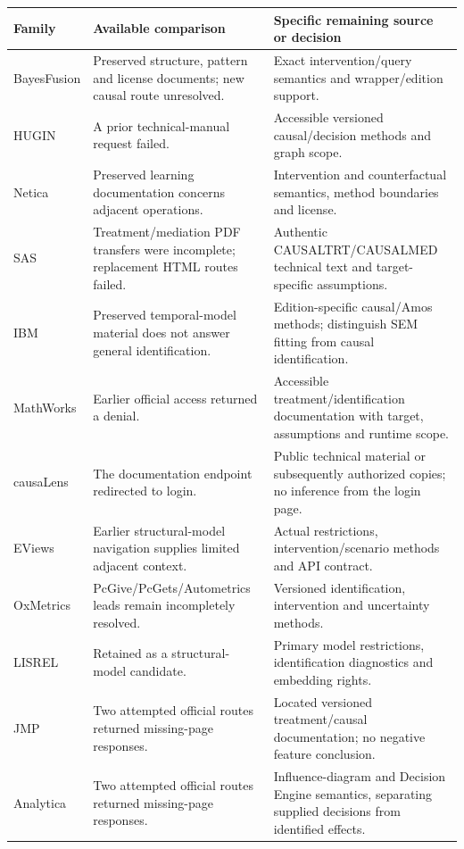 \begin{longtable}{p{}p{}p{}}
\toprule
Family & Available comparison & Specific remaining source or decision \\
\midrule
\endhead
BayesFusion & Preserved structure, pattern and license documents; new causal route unresolved. & Exact intervention/query semantics and wrapper/edition support. \\
HUGIN & A prior technical-manual request failed. & Accessible versioned causal/decision methods and graph scope. \\
Netica & Preserved learning documentation concerns adjacent operations. & Intervention and counterfactual semantics, method boundaries and license. \\
SAS & Treatment/mediation PDF transfers were incomplete; replacement HTML routes failed. & Authentic CAUSALTRT/CAUSALMED technical text and target-specific assumptions. \\
IBM & Preserved temporal-model material does not answer general identification. & Edition-specific causal/Amos methods; distinguish SEM fitting from causal identification. \\
MathWorks & Earlier official access returned a denial. & Accessible treatment/identification documentation with target, assumptions and runtime scope. \\
causaLens & The documentation endpoint redirected to login. & Public technical material or subsequently authorized copies; no inference from the login page. \\
EViews & Earlier structural-model navigation supplies limited adjacent context. & Actual restrictions, intervention/scenario methods and API contract. \\
OxMetrics & PcGive/PcGets/Autometrics leads remain incompletely resolved. & Versioned identification, intervention and uncertainty methods. \\
LISREL & Retained as a structural-model candidate. & Primary model restrictions, identification diagnostics and embedding rights. \\
JMP & Two attempted official routes returned missing-page responses. & Located versioned treatment/causal documentation; no negative feature conclusion. \\
Analytica & Two attempted official routes returned missing-page responses. & Influence-diagram and Decision Engine semantics, separating supplied decisions from identified effects. \\
\bottomrule
\end{longtable}

